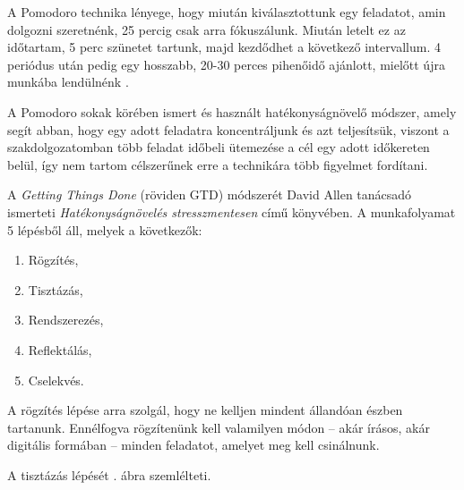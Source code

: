 
A Pomodoro technika lényege, hogy miután kiválasztottunk egy feladatot, amin dolgozni szeretnénk, 25 percig csak arra fókuszálunk. Miután letelt ez az időtartam, 5 perc szünetet tartunk, majd kezdődhet a következő intervallum. 4 periódus után pedig egy hosszabb, 20-30 perces pihenőidő ajánlott, mielőtt újra munkába lendülnénk \cite{cirillo2006pomodoro}.

A Pomodoro sokak körében ismert és használt hatékonyságnövelő módszer, amely segít abban, hogy egy adott feladatra koncentráljunk és azt teljesítsük, viszont a szakdolgozatomban több feladat időbeli ütemezése a cél egy adott időkereten belül, így nem tartom célszerűnek erre a technikára több figyelmet fordítani.


A \textit{Getting Things Done} (röviden GTD) módszerét David Allen tanácsadó ismerteti \textit{Hatékonyságnövelés stresszmentesen} című könyvében. A munkafolyamat 5 lépésből áll, melyek a következők:
\begin{enumerate}
\item Rögzítés,
\item Tisztázás,
\item Rendszerezés,
\item Reflektálás,
\item Cselekvés.
\end{enumerate}

A rögzítés lépése arra szolgál, hogy ne kelljen mindent állandóan észben tartanunk. Ennélfogva rögzítenünk kell valamilyen módon -- akár írásos, akár digitális formában -- minden feladatot, amelyet meg kell csinálnunk.

A tisztázás lépését . ábra szemlélteti.

